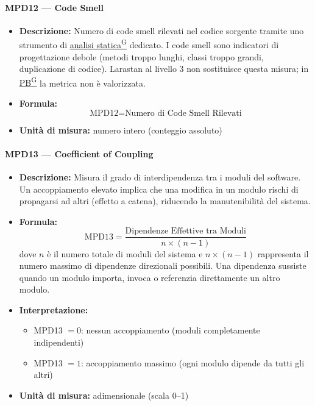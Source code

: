 \documentclass[a4paper,12pt]{article}
\providecommand{\glslink}[2]{\href{https://alittlebyte-19.github.io/Documentazione/glossario.html\#gls-#1}{\underline{#2}\textsuperscript{\scriptsize G}}}
\begin{document}
\paragraph{MPD12 --- Code Smell}
\begin{itemize}
    \item \textbf{Descrizione:} Numero di code smell rilevati nel codice sorgente tramite uno strumento di \glslink{analisi-statica}{analisi statica} dedicato. I code smell sono indicatori di progettazione debole (metodi troppo lunghi, classi troppo grandi, duplicazione di codice). Larastan al livello 3 non sostituisce questa misura; in \glslink{pb-product-baseline}{PB} la metrica non è valorizzata.
    \item \textbf{Formula:}
    $$\text{MPD12} = \text{Numero di Code Smell Rilevati}$$
    \item \textbf{Unità di misura:} numero intero (conteggio assoluto)
\end{itemize}

\paragraph{MPD13 --- Coefficient of Coupling}
\begin{itemize}
    \item \textbf{Descrizione:} Misura il grado di interdipendenza tra i moduli del software. Un accoppiamento elevato implica che una modifica in un modulo rischi di propagarsi ad altri (effetto a catena), riducendo la manutenibilità del sistema.
    \item \textbf{Formula:}
    $$\text{MPD13} = \frac{\text{Dipendenze Effettive tra Moduli}}{n \times (n - 1)}$$
    dove $n$ è il numero totale di moduli del sistema e $n \times (n-1)$ rappresenta il numero massimo di dipendenze direzionali possibili. Una dipendenza sussiste quando un modulo importa, invoca o referenzia direttamente un altro modulo.
    \item \textbf{Interpretazione:}
    \begin{itemize}
        \item MPD13 $= 0$: nessun accoppiamento (moduli completamente indipendenti)
        \item MPD13 $= 1$: accoppiamento massimo (ogni modulo dipende da tutti gli altri)
    \end{itemize}
    \item \textbf{Unità di misura:} adimensionale (scala 0--1)
\end{itemize}
\end{document}
